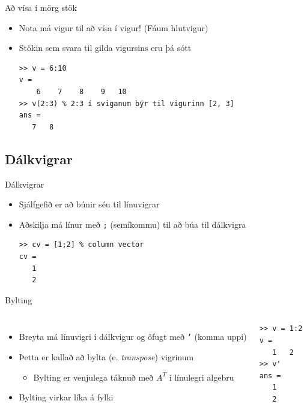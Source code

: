 \documentclass[handout]{beamer}
\begin{document}
\begin{frame}[fragile]{Að vísa í mörg stök}
\begin{itemize}
 \item Nota má vigur til að vísa í vigur! (Fáum hlutvigur)
 \item Stökin sem svara til gilda vigursins eru þá sótt
\begin{verbatim}
>> v = 6:10
v =
    6    7    8    9   10
>> v(2:3) % 2:3 í sviganum býr til vigurinn [2, 3]
ans =
   7   8
\end{verbatim}
\end{itemize}
\end{frame}

\subsection{Dálkvigrar}

\begin{frame}[fragile]{Dálkvigrar}
\begin{itemize}
 \item Sjálfgefið er að búnir séu til línuvigrar
 \item Aðskilja má línur með \texttt{;} (semíkommu) til að búa til dálkvigra
\begin{verbatim}
>> cv = [1;2] % column vector
cv =
   1
   2
\end{verbatim}
\end{itemize}
\end{frame}

\begin{frame}[fragile]{Bylting}
\begin{columns}
\begin{itemize}
 \item Breyta má línuvigri í dálkvigur og öfugt með \texttt{'} (komma uppi)
 \item Þetta er kallað að bylta (e. \emph{transpose}) vigrinum
 \begin{itemize}
  \item Bylting er venjulega táknuð með $A^T$ í línulegri algebru
 \end{itemize}
 \item Bylting virkar líka á fylki
\end{itemize}
\begin{verbatim}
>> v = 1:2
v =
   1   2
>> v'
ans =
   1
   2
\end{verbatim}
\end{columns}
\end{frame}
\end{document}
